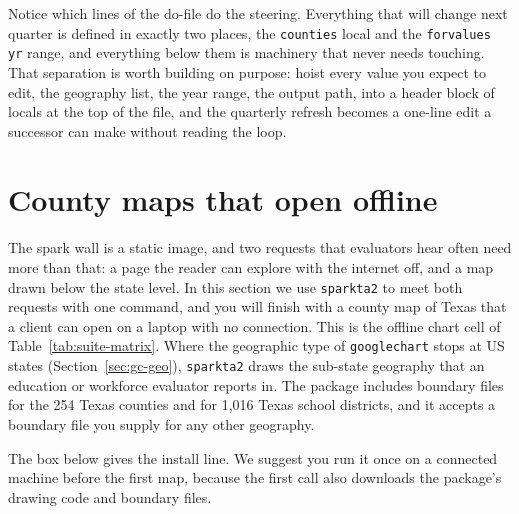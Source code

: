 Notice which lines of the do-file do the steering. Everything that will change next quarter is defined in exactly two places, the \texttt{counties} local and the \texttt{forvalues yr} range, and everything below them is machinery that never needs touching. That separation is worth building on purpose: hoist every value you expect to edit, the geography list, the year range, the output path, into a header block of locals at the top of the file, and the quarterly refresh becomes a one-line edit a successor can make without reading the loop.

\section{County maps that open offline}\label{sec:sparkta2}
The spark wall is a static image, and two requests that evaluators hear often need more than that: a page the reader can explore with the internet off, and a map drawn below the state level. In this section we use \texttt{sparkta2} to meet both requests with one command, and you will finish with a county map of Texas that a client can open on a laptop with no connection. This is the offline chart cell of Table~\ref{tab:suite-matrix}. Where the geographic type of \texttt{googlechart} stops at US states (Section~\ref{sec:gc-geo}), \texttt{sparkta2} draws the sub-state geography that an education or workforce evaluator reports in. The package includes boundary files for the 254 Texas counties and for 1,016 Texas school districts, and it accepts a boundary file you supply for any other geography.

The box below gives the install line. We suggest you run it once on a connected machine before the first map, because the first call also downloads the package's drawing code and boundary files.


